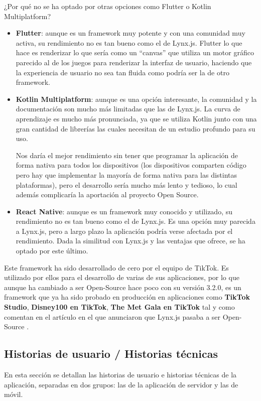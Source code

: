 ¿Por qué no se ha optado por otras opciones como Flutter o Kotlin Multiplatform?
\begin{itemize}
    \item \textbf{Flutter}: aunque es un framework muy potente y con una comunidad muy activa, su rendimiento no es tan bueno como el de Lynx.js. 
        Flutter lo que hace es renderizar lo que sería como un ``canvas'' que utiliza un motor gráfico parecido al de los juegos para renderizar la interfaz de usuario, haciendo que la experiencia de usuario no sea tan fluida como podría ser la de otro framework. 
    \item \textbf{Kotlin Multiplatform}: aunque es una opción interesante, la comunidad y la documentación son mucho más limitadas que las de Lynx.js. La curva de aprendizaje es mucho más pronunciada, ya que se utiliza Kotlin junto con una gran cantidad de librerías las cuales necesitan de un estudio profundo para su uso.

        Nos daría el mejor rendimiento sin tener que programar la aplicación de forma nativa para todos los dispositivos (los dispositivos comparten código pero hay que implementar la mayoría de forma nativa para las distintas plataformas), pero el desarrollo sería mucho más lento y tedioso, lo cual además complicaría la aportación al proyecto Open Source.
    \item \textbf{React Native}: aunque es un framework muy conocido y utilizado, su rendimiento no es tan bueno como el de Lynx.js.
        Es una opción muy parecida a Lynx.js, pero a largo plazo la aplicación podría verse afectada por el rendimiento.
        Dada la similitud con Lynx.js y las ventajas que ofrece, se ha optado por este último.
\end{itemize}

Este framework ha sido desarrollado de cero por el equipo de TikTok. Es utilizado por ellos para el desarrollo de varias de sus aplicaciones, por lo que aunque ha cambiado a ser Open-Source hace poco con su versión 3.2.0, es un framework que ya ha sido probado en producción en aplicaciones como \textbf{TikTok Studio}, \textbf{Disney100 en TikTok}, \textbf{The Met Gala en TikTok} tal y como comentan en el artículo en el que anunciaron que Lynx.js pasaba a ser Open-Source \parencite{lynx-article}.

\subsection{Historias de usuario / Historias técnicas}
\label{sec:historias-de-usuario}
En esta sección se detallan las historias de usuario e historias técnicas de la aplicación, separadas en dos grupos: las de la aplicación de servidor y las de móvil.

